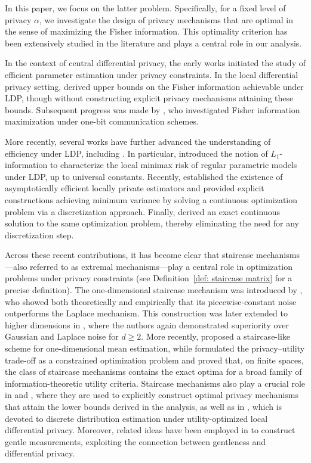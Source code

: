 \documentclass[a4paper, 11pt]{article}
\theoremstyle{definition}
\begin{document}
{In this paper, we focus on the latter problem. Specifically, for a fixed level of privacy \( \alpha \), we investigate the design of privacy mechanisms that are optimal in the sense of maximizing the Fisher information. This optimality criterion has been extensively studied in the literature and plays a central role in our analysis.

In the context of central differential privacy, the early works \cite{Smi08,Smi11} initiated the study of efficient parameter estimation under privacy constraints. In the local differential privacy setting, \cite{BarChe20} derived upper bounds on the Fisher information achievable under LDP, though without constructing explicit privacy mechanisms attaining these bounds. Subsequent progress was made by \cite{NamLee22}, who investigated Fisher information maximization under one-bit communication schemes.

More recently, several works have further advanced the understanding of efficiency under LDP, including \cite{duchi2024right, steinberger2024efficiency,amorino2025factorization}. In particular, \cite{duchi2024right} introduced the notion of \(L_1\)-information to characterize the local minimax risk of regular parametric models under LDP, up to universal constants. Recently, \cite{steinberger2024efficiency} established the existence of asymptotically efficient locally private estimators and provided explicit constructions achieving minimum variance by solving a continuous optimization problem via a discretization approach. Finally, \cite{amorino2025factorization} derived an exact continuous solution to the same optimization problem, thereby eliminating the need for any discretization step.

Across these recent contributions, it has become clear that staircase mechanisms—also referred to as extremal mechanisms—play a central role in optimization problems under privacy constraints (see Definition~\ref{def: staircase matrix} for a precise definition). The one-dimensional staircase mechanism was introduced by \cite{GenVis12}, who showed both theoretically and empirically that its piecewise-constant noise outperforms the Laplace mechanism. This construction was later extended to higher dimensions in \cite{Gen15}, where the authors again demonstrated superiority over Gaussian and Laplace noise for \( d \geq 2 \). More recently, \cite{Kul23} proposed a staircase-like scheme for one-dimensional mean estimation, while \cite{kairouz2016extremal} formulated the privacy--utility trade-off as a constrained optimization problem and proved that, on finite spaces, the class of staircase mechanisms contains the exact optima for a broad family of information-theoretic utility criteria. Staircase mechanisms also play a crucial role in \cite{steinberger2024efficiency} and \cite{kalinin2024efficient}, where they are used to explicitly construct optimal privacy mechanisms that attain the lower bounds derived in the analysis, as well as in \cite{yoon2025fundamental}, which is devoted to discrete distribution estimation under utility-optimized local differential privacy. Moreover, related ideas have been employed in \cite{butucea2025sample} to construct gentle measurements, exploiting the connection between gentleness and differential privacy.


}
\end{document}
